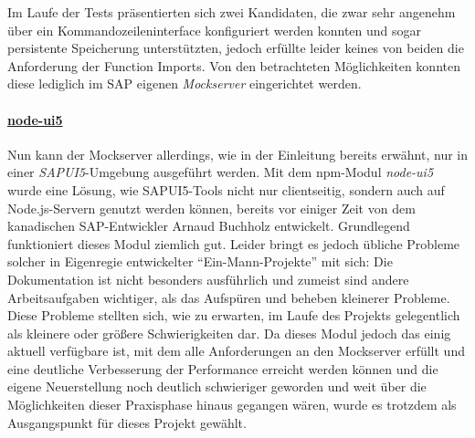 Im Laufe der Tests präsentierten sich zwei Kandidaten, die zwar sehr angenehm über ein Kommandozeileninterface konfiguriert werden konnten und sogar persistente Speicherung unterstützten, jedoch erfüllte leider keines von beiden die Anforderung der Function Imports.
Von den betrachteten Möglichkeiten konnten diese lediglich im SAP eigenen \emph{Mockserver} eingerichtet werden.

\paragraph{\href{https://github.com/ArnaudBuchholz/node-ui5}{node-ui5}}
Nun kann der Mockserver allerdings, wie in der Einleitung bereits erwähnt, nur in einer \emph{SAPUI5}-Umgebung ausgeführt werden.
Mit dem \ac{npm}-Modul \emph{node-ui5} wurde eine Lösung, wie SAPUI5-Tools nicht nur clientseitig, sondern auch auf Node.js-Servern genutzt werden können, bereits vor einiger Zeit von dem kanadischen SAP-Entwickler Arnaud Buchholz entwickelt.
Grundlegend funktioniert dieses Modul ziemlich gut.
Leider bringt es jedoch übliche Probleme solcher in Eigenregie entwickelter \enquote{Ein-Mann-Projekte} mit sich: Die Dokumentation ist nicht besonders ausführlich und zumeist sind andere Arbeitsaufgaben wichtiger, als das Aufspüren und beheben kleinerer Probleme.
Diese Probleme stellten sich, wie zu erwarten, im Laufe des Projekts gelegentlich als kleinere oder größere Schwierigkeiten dar.
Da dieses Modul jedoch das einig aktuell verfügbare ist, mit dem alle Anforderungen an den Mockserver erfüllt und eine deutliche Verbesserung der Performance erreicht werden können und die eigene Neuerstellung noch deutlich schwieriger geworden und weit über die Möglichkeiten dieser Praxisphase hinaus gegangen wären, wurde es trotzdem als Ausgangspunkt für dieses Projekt gewählt.